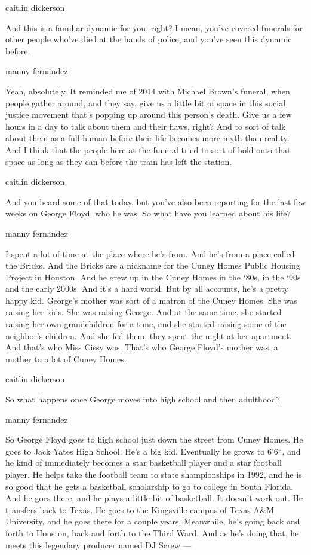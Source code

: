 caitlin dickerson

And this is a familiar dynamic for you, right? I mean, you've covered
funerals for other people who've died at the hands of police, and you've
seen this dynamic before.

manny fernandez

Yeah, absolutely. It reminded me of 2014 with Michael Brown's funeral,
when people gather around, and they say, give us a little bit of space
in this social justice movement that's popping up around this person's
death. Give us a few hours in a day to talk about them and their flaws,
right? And to sort of talk about them as a full human before their life
becomes more myth than reality. And I think that the people here at the
funeral tried to sort of hold onto that space as long as they can before
the train has left the station.

caitlin dickerson

And you heard some of that today, but you've also been reporting for the
last few weeks on George Floyd, who he was. So what have you learned
about his life?

manny fernandez

I spent a lot of time at the place where he's from. And he's from a
place called the Bricks. And the Bricks are a nickname for the Cuney
Homes Public Housing Project in Houston. And he grew up in the Cuney
Homes in the `80s, in the `90s and the early 2000s. And it's a hard
world. But by all accounts, he's a pretty happy kid. George's mother was
sort of a matron of the Cuney Homes. She was raising her kids. She was
raising George. And at the same time, she started raising her own
grandchildren for a time, and she started raising some of the neighbor's
children. And she fed them, they spent the night at her apartment. And
that's who Miss Cissy was. That's who George Floyd's mother was, a
mother to a lot of Cuney Homes.

caitlin dickerson

So what happens once George moves into high school and then adulthood?

manny fernandez

So George Floyd goes to high school just down the street from Cuney
Homes. He goes to Jack Yates High School. He's a big kid. Eventually he
grows to 6'6``, and he kind of immediately becomes a star basketball
player and a star football player. He helps take the football team to
state shampionships in 1992, and he is so good that he gets a basketball
scholarship to go to college in South Florida. And he goes there, and he
plays a little bit of basketball. It doesn't work out. He transfers back
to Texas. He goes to the Kingsville campus of Texas A\&M University, and
he goes there for a couple years. Meanwhile, he's going back and forth
to Houston, back and forth to the Third Ward. And as he's doing that, he
meets this legendary producer named DJ Screw ---

